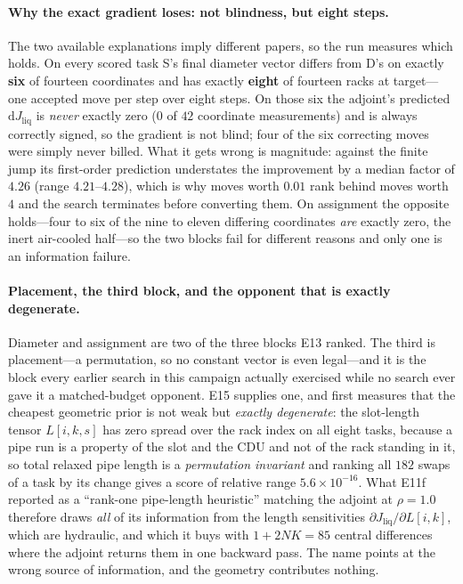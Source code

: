 \documentclass{article}
\newcommand{\Jliq}{J_{\mathrm{liq}}}
\begin{document}
\paragraph{Why the exact gradient loses: not blindness, but eight steps.}
The two available explanations imply different papers, so the run measures which holds.
On every scored task S's final diameter vector differs from D's on exactly \textbf{six} of
fourteen coordinates and has exactly \textbf{eight} of fourteen racks at target---one
accepted move per step over eight steps.  On those six the adjoint's predicted
$\mathrm{d}\Jliq$ is \emph{never} exactly zero ($0$ of $42$ coordinate measurements) and is
always correctly signed, so the gradient is not blind; four of the six correcting moves
were simply never billed.  What it gets wrong is magnitude: against the finite jump its
first-order prediction understates the improvement by a median factor of $4.26$ (range
$4.21$--$4.28$), which is why moves worth $0.01$ rank behind moves worth $4$ and the search
terminates before converting them.  On assignment the opposite holds---four to six of the
nine to eleven differing coordinates \emph{are} exactly zero, the inert air-cooled
half---so the two blocks fail for different reasons and only one is an information
failure.

\paragraph{Placement, the third block, and the opponent that is exactly degenerate.}
Diameter and assignment are two of the three blocks E13 ranked.  The third is placement---a
permutation, so no constant vector is even legal---and it is the block every earlier search
in this campaign actually exercised while no search ever gave it a matched-budget opponent.
E15 supplies one, and first measures that the cheapest geometric prior is not weak but
\emph{exactly degenerate}: the slot-length tensor $L[i,k,s]$ has zero spread over the rack
index on all eight tasks, because a pipe run is a property of the slot and the CDU and not
of the rack standing in it, so total relaxed pipe length is a \emph{permutation invariant}
and ranking all $182$ swaps of a task by its change gives a score of relative range
$5.6\times10^{-16}$.  What E11f reported as a ``rank-one pipe-length heuristic'' matching
the adjoint at $\rho = 1.0$ therefore draws \emph{all} of its information from the length
sensitivities $\partial\Jliq/\partial L[i,k]$, which are hydraulic, and which it buys with
$1 + 2NK = 85$ central differences where the adjoint returns them in one backward pass.  The
name points at the wrong source of information, and the geometry contributes nothing.
\end{document}
